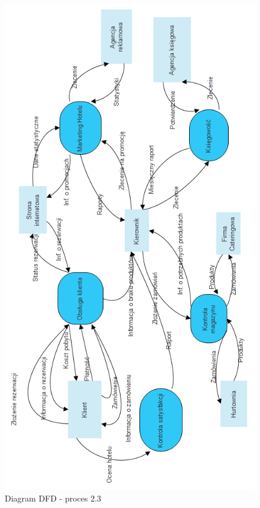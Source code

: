 \documentclass[a4paper, 11pt]{article}
\begin{document}
	\begin{figure}[H]%
			\center
			\includegraphics[scale=0.7]{Img/DFDpoziom0.png}
			\caption{Diagram DFD - proces 2.3}
	\end{figure}
\end{document}
